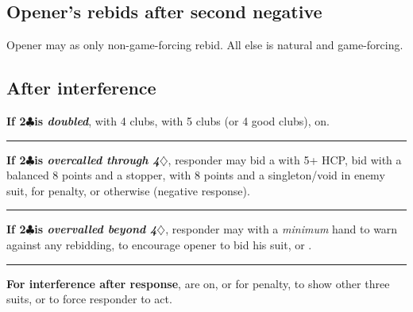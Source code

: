 \documentclass[oneside]{memoir}
\def\C{$\clubsuit$}
\def\D{$\diamondsuit$}
\begin{document}
\subsection{Opener's rebids after second negative}
Opener may  as only non-game-forcing
rebid.  All else is natural and game-forcing.

\subsection{After interference}

\iffalse %
\begin{ptable}\headings{0-4|5-7|8+}
\multicolumn4c{After double (other responses on)}\\
\row{4 clubs}\bid(0-8,lblue){pass}\\
\row{5 clubs (4 good clubs)}\bid(0-8,lyellow){redouble}\\
\multicolumn4c{After overcall beyond 4\D}\\
\row{good 6-card or longer suit}\bid(0-7,lorange){double}
  \bid(8,lyellow){bid suit}\\
\row{want to hear opener's suit}\bid*(0-4,lorange){double}
  \bid(5-8,lred){pass}\\
\end{ptable}\hfill
\begin{ptable}\headings{0-4|5-7|8+}
\multicolumn4c{After overcall through 4\D}\\
\row{5-card suit}\bid*(0-4,lorange){pass}\bid(5-8,lgreen){bid suit}\\
\row{long enemy suit}\bid*(0-4,lorange){pass}\bid(5-8,laqua){penalty double}\\
\row{balanced + 1 stopper}\bid*(0-7,lorange){pass}\bid(8,lred){NT}\\
\row{\singleton/void in enemy suit}\bid(0-7,lorange){\clift{pass}}
  \bid(8,lpurple){cue-bid}\\
\end{ptable}
\fi

\noindent \textbf{If 2\C is \emph{doubled}}, 
with 4 clubs,  with 5 clubs (or 4 good
clubs),  on.
\vskip0.25pc\hrule\vskip0.25pc
\noindent \textbf{If 2\C is \emph{overcalled through 4\D}}, responder may bid a
 with 5+ HCP, bid 
with a balanced 8 points and a stopper, 
with 8 points and a singleton/void in enemy suit, 
for penalty, or  otherwise (negative response).
\vskip0.25pc\hrule\vskip0.25pc
\noindent \textbf{If 2\C is \emph{overvalled beyond 4\D}}, responder may
 with a \emph{minimum} hand to warn against any
rebidding,  to encourage opener to bid his suit,
or .
\vskip0.25pc\hrule\vskip0.25pc
\noindent \textbf{For interference after response},
 are on,  or
 for penalty,  to show
other three suits, or  to force responder
to act.
\end{document}
